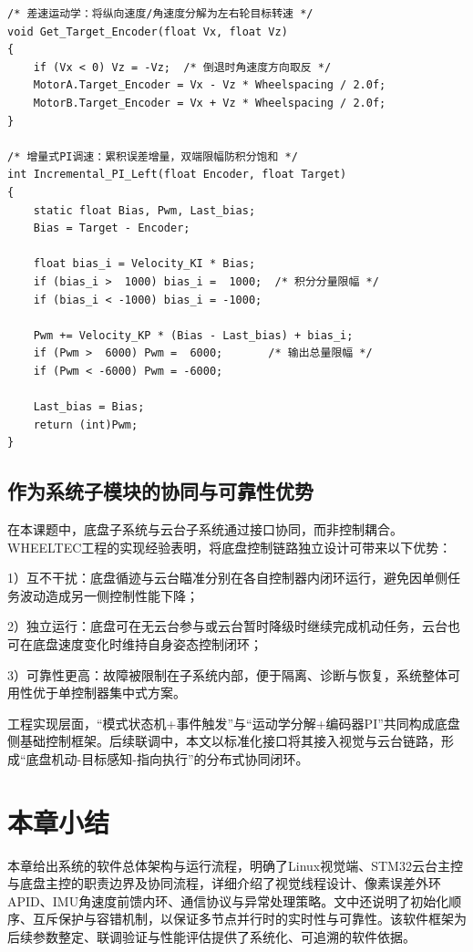 \begin{lstlisting}[style=cstyle, caption={差速运动学分解与增量式PI调速（control.c）}, label=code:chassis-pi]
/* 差速运动学：将纵向速度/角速度分解为左右轮目标转速 */
void Get_Target_Encoder(float Vx, float Vz)
{
    if (Vx < 0) Vz = -Vz;  /* 倒退时角速度方向取反 */
    MotorA.Target_Encoder = Vx - Vz * Wheelspacing / 2.0f;
    MotorB.Target_Encoder = Vx + Vz * Wheelspacing / 2.0f;
}

/* 增量式PI调速：累积误差增量，双端限幅防积分饱和 */
int Incremental_PI_Left(float Encoder, float Target)
{
    static float Bias, Pwm, Last_bias;
    Bias = Target - Encoder;

    float bias_i = Velocity_KI * Bias;
    if (bias_i >  1000) bias_i =  1000;  /* 积分分量限幅 */
    if (bias_i < -1000) bias_i = -1000;

    Pwm += Velocity_KP * (Bias - Last_bias) + bias_i;
    if (Pwm >  6000) Pwm =  6000;       /* 输出总量限幅 */
    if (Pwm < -6000) Pwm = -6000;

    Last_bias = Bias;
    return (int)Pwm;
}
\end{lstlisting}
\subsection{作为系统子模块的协同与可靠性优势}

在本课题中，底盘子系统与云台子系统通过接口协同，而非控制耦合。WHEELTEC工程的实现经验表明，将底盘控制链路独立设计可带来以下优势：

1）互不干扰：底盘循迹与云台瞄准分别在各自控制器内闭环运行，避免因单侧任务波动造成另一侧控制性能下降；

2）独立运行：底盘可在无云台参与或云台暂时降级时继续完成机动任务，云台也可在底盘速度变化时维持自身姿态控制闭环；

3）可靠性更高：故障被限制在子系统内部，便于隔离、诊断与恢复，系统整体可用性优于单控制器集中式方案。

工程实现层面，“模式状态机+事件触发”与“运动学分解+编码器PI”共同构成底盘侧基础控制框架。后续联调中，本文以标准化接口将其接入视觉与云台链路，形成“底盘机动-目标感知-指向执行”的分布式协同闭环。
\section{本章小结}

本章给出系统的软件总体架构与运行流程，明确了Linux视觉端、STM32云台主控与底盘主控的职责边界及协同流程，详细介绍了视觉线程设计、像素误差外环APID、IMU角速度前馈内环、通信协议与异常处理策略。文中还说明了初始化顺序、互斥保护与容错机制，以保证多节点并行时的实时性与可靠性。该软件框架为后续参数整定、联调验证与性能评估提供了系统化、可追溯的软件依据。

